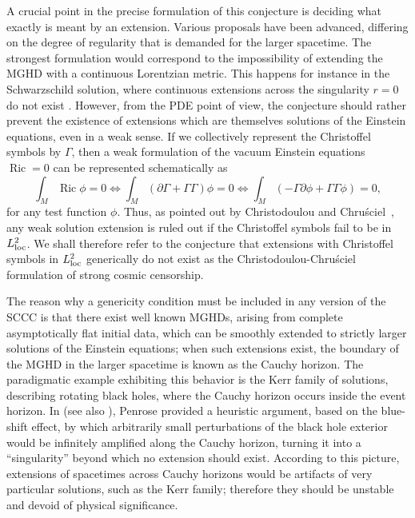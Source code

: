\documentclass[a4paper,11pt,oneside,reqno]{amsart}
\newcommand{\Ric}{\operatorname{Ric}}
\begin{document}
A crucial point in the precise formulation of this conjecture is deciding what exactly is meant by an extension. Various proposals have been advanced, differing on the degree of regularity that is demanded for the larger spacetime. The strongest formulation would correspond to the impossibility of extending the MGHD with a continuous Lorentzian metric. This happens for instance in the Schwarzschild solution, where continuous extensions across the singularity $r=0$ do not exist \cite{Sbierski}. However, from the PDE point of view, the conjecture should rather prevent the existence of extensions which are themselves solutions of the Einstein equations, even in a weak sense. If we collectively represent the Christoffel symbols by $\Gamma$, then a weak formulation of the vacuum Einstein equations $\Ric=0$ can be represented schematically as
\[
\int_M \Ric \phi = 0 \Leftrightarrow \int_M (\partial \Gamma + \Gamma \Gamma) \phi = 0 \Leftrightarrow \int_M ( - \Gamma \partial \phi + \Gamma \Gamma \phi) = 0,
\]
for any test function $\phi$. Thus, as pointed out by Christodoulou and Chru\'sciel~\cite{Christodoulou:2008, ChruscielSCC}, any weak solution extension is ruled out if the Christoffel symbols fail to be in $L^2_{{\rm loc}}$. We shall therefore refer to the conjecture that extensions with Christoffel symbols in $L^2_{{\rm loc}}$ generically do not exist as the Christodoulou-Chru\'sciel formulation of strong cosmic censorship.

The reason why a genericity condition must be included in any version of the SCCC is that there exist well known MGHDs, arising from complete asymptotically flat initial data, which can be smoothly extended to strictly larger solutions of the Einstein equations; when such extensions exist, the boundary of the MGHD in the larger spacetime is known as the Cauchy horizon. The paradigmatic example exhibiting this behavior is the Kerr family of solutions, describing rotating black holes, where the Cauchy horizon occurs inside the event horizon. In \cite{PenroseBatelle} (see also \cite{SimpsonInternal}), Penrose provided a heuristic argument, based on the blue-shift effect, by which arbitrarily small perturbations of the black hole exterior would be infinitely amplified along the Cauchy horizon, turning it into a ``singularity'' beyond which no extension should exist. According to this picture, extensions of spacetimes across Cauchy horizons would be artifacts of very particular solutions, such as the Kerr family; therefore they should be unstable and devoid of physical significance.
\end{document}
